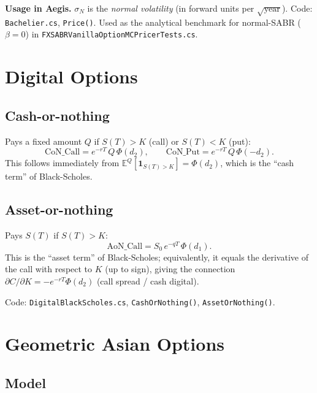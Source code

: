 \documentclass[11pt,a4paper]{article}
\newcommand{\E}{\mathbb{E}}
\newcommand{\coderef}[1]{\texttt{\color{blue!60!black}#1}}
\theoremstyle{definition}
\begin{document}
\textbf{Usage in Aegis.} $\sigma_N$ is the \emph{normal volatility} (in
forward units per $\sqrt{\text{year}}$).  Code: \coderef{Bachelier.cs},
\texttt{Price()}.  Used as the analytical benchmark for normal-SABR ($\beta=0$)
in \coderef{FXSABRVanillaOptionMCPricerTests.cs}.

\section{Digital Options}
\label{sec:digital}

\subsection{Cash-or-nothing}

Pays a fixed amount $Q$ if $S(T)>K$ (call) or $S(T)<K$ (put):
\[
  \mathrm{CoN\_Call} = e^{-rT}\,Q\,\Phi(d_2),
  \qquad
  \mathrm{CoN\_Put}  = e^{-rT}\,Q\,\Phi(-d_2).
\]
This follows immediately from $\E^Q[\mathbf{1}_{S(T)>K}]=\Phi(d_2)$, which
is the ``cash term'' of Black-Scholes.

\subsection{Asset-or-nothing}

Pays $S(T)$ if $S(T)>K$:
\[
  \mathrm{AoN\_Call} = S_0\,e^{-qT}\,\Phi(d_1).
\]
This is the ``asset term'' of Black-Scholes; equivalently, it equals the
derivative of the call with respect to $K$ (up to sign), giving the
connection $\partial C/\partial K = -e^{-rT}\Phi(d_2)$ (call spread / cash
digital).

Code: \coderef{DigitalBlackScholes.cs}, \texttt{CashOrNothing()},
\texttt{AssetOrNothing()}.

\section{Geometric Asian Options}
\label{sec:asian}

\subsection{Model}
\end{document}
